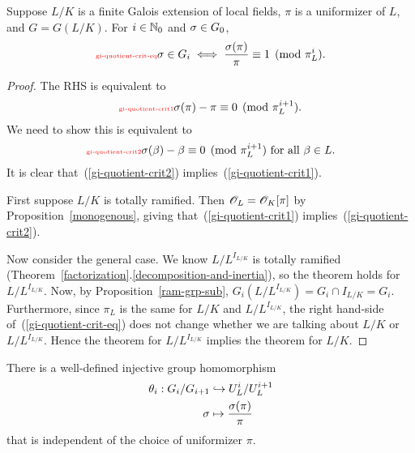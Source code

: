 \begin{lem}
Suppose $L/K$ is a finite Galois extension of local fields, $\pi$ is a uniformizer of $L$, and $G=G(L/K)$. 
For $i\in \mathbb{N}_0$ and $\sigma\in G_0$,
\begin{equation}\llabel{gi-quotient-crit-eq}
\si\in G_i\iff \fc{\si(\pi)}{\pi}\equiv 1\pmod{\pi_L^i}.
\end{equation}
\end{lem}
\begin{proof}
The RHS is equivalent to 
\begin{equation}\llabel{gi-quotient-crit1}
\si(\pi)-\pi\equiv 0\pmod{\pi_L^{i+1}}.
\end{equation}
We need to show this is equivalent to
\begin{equation}\llabel{gi-quotient-crit2}
\si(\be)-\be\equiv 0\pmod{\pi_L^{i+1}}\text{ for all }\be\in L.
\end{equation}
It is clear that~(\ref{gi-quotient-crit2}) implies~(\ref{gi-quotient-crit1}).

First suppose $L/K$ is totally ramified. Then $\mathscr{O}_L=\mathscr{O}_K[\pi]$ by Proposition~\ref{monogenous}, giving that~(\ref{gi-quotient-crit1}) implies~(\ref{gi-quotient-crit2}).

Now consider the general case. We know $L/L^{I_{L/K}}$ is totally ramified (Theorem~\ref{factorization}.\ref{decomposition-and-inertia}), so the theorem holds for $L/L^{I_{L/K}}$.
Now, by Proposition~\ref{ram-grp-sub},
 $G_i(L/L^{I_{L/K}})=G_i\cap I_{L/K}=G_i$. Furthermore, since $\pi_L$ is the same for $L/K$ and $L/L^{I_{L/K}}$, the right hand-side of~(\ref{gi-quotient-crit-eq}) does not change whether we are talking about $L/K$ or $L/L^{I_{L/K}}$. Hence the theorem for $L/L^{I_{L/K}}$ implies the theorem for $L/K$.
\end{proof}
\begin{pr}
There is a well-defined injective group homomorphism
\begin{align*}
\theta_i:G_i/G_{i+1}&\hookrightarrow U_L^i/U_L^{i+1}\\
\sigma&\mapsto \frac{\sigma(\pi)}{\pi}
\end{align*}
that is independent of the choice of uniformizer $\pi$.
\end{pr}
